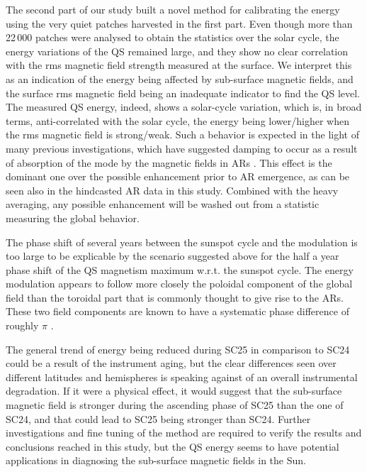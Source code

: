 \documentclass{aa}
\begin{document}
The second part of our study built a novel method for calibrating the \fff energy using the very quiet patches harvested in the first part. Even though more than 22\,000 patches were analysed to obtain the statistics over the solar cycle, the \fff energy variations of the QS remained large, and they show no clear correlation with the 
rms magnetic field strength
measured at the surface. We interpret this as an indication of the \fff energy being affected by sub-surface magnetic fields, and the surface rms magnetic field being an inadequate indicator to find the QS level. 
The measured QS \fff energy, indeed, shows a solar-cycle variation, which is, in broad terms, anti-correlated with the solar cycle, the \fff energy being lower/higher when the
rms
magnetic field is strong/weak.
Such a behavior is expected in the light of many previous investigations, which have suggested \fff damping to occur as a result of absorption of the \fff mode by the magnetic fields in ARs \citep{Cally+94,CB97,SRB16}. This effect is the dominant one over the
possible enhancement prior to AR emergence,
as can be seen also in the hindcasted AR data in this 
study. Combined with the heavy averaging, any possible enhancement 
will be washed out from a statistic measuring the global behavior.

The phase shift of several years between the sunspot cycle and the \fff modulation is too large to be explicable by the scenario suggested above for the half a year phase shift of the QS magnetism maximum w.r.t. the sunspot cycle. The \fff energy modulation appears to follow more closely the poloidal component of the global field than the toroidal part that is commonly thought to give rise to the ARs. These two field components are known to have a systematic phase difference of roughly $\pi$ \cite[see, e.g.,][]{char10}. 

The general trend of \fff energy being reduced during SC25 in comparison to SC24 could be a result of the instrument aging, but the clear differences seen over different latitudes and hemispheres is speaking against of an overall instrumental degradation. If it were a physical effect, it would suggest that the sub-surface magnetic field is stronger during the ascending phase of SC25 than the one of SC24, and that could lead to SC25 being stronger than SC24. Further investigations and fine tuning of the method are required to verify the results and conclusions reached in this study, but the QS \fff energy seems to have potential applications in diagnosing the sub-surface magnetic fields in the Sun.
\end{document}
